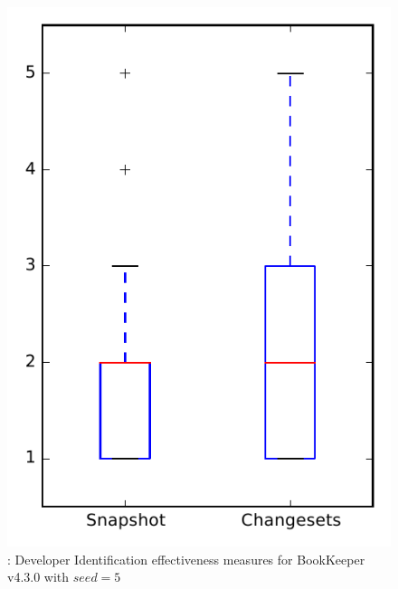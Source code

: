 
\begin{figure}
\centering
\includegraphics[height=0.4\textheight]{figures/dit_seed/rq1_bookkeeper_5}
\caption{\rtwo: Developer Identification effectiveness measures for BookKeeper v4.3.0 with $seed=5$}
\label{fig:dit_seed:rq1:bookkeeper}
\end{figure}
